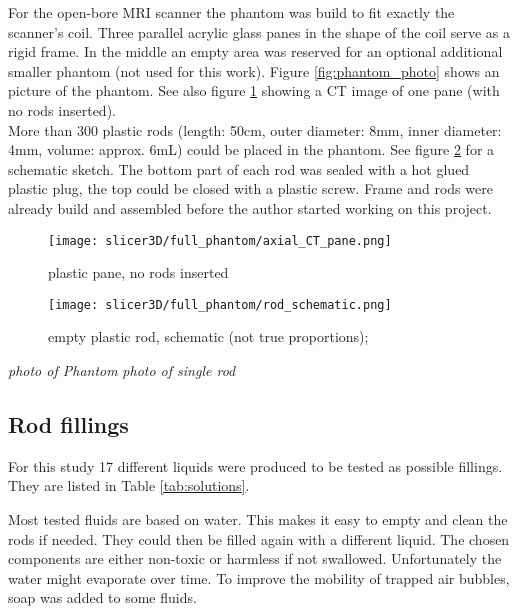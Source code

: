 For the open-bore MRI scanner the phantom was build to fit exactly the scanner's coil.
Three parallel acrylic glass panes in the shape of the coil serve as a rigid frame.
In the middle an empty area was reserved for an optional additional smaller phantom (not used for this work).
Figure \ref{fig:phantom_photo} shows an picture of the phantom. See also figure \ref{fig:axial_CT_pane} showing a CT image of one pane (with no rods inserted). \\
More than 300 plastic rods (length: 50cm, outer diameter: 8mm, inner diameter: 4mm, volume: approx. 6mL) could be placed in the phantom.
See figure \ref{fig:rod_schematic} for a schematic sketch.
The bottom part of each rod was sealed with a hot glued plastic plug, the top could be closed with a plastic screw.
Frame and rods were already build and assembled before the author started working on this project.



\begin{figure}[!tbp]
\centering
\texttt{[image: slicer3D/full\_phantom/axial\_CT\_pane.png]}
\caption{plastic pane, no rods inserted}
\label{fig:axial_CT_pane}
\end{figure}

\begin{figure}[!tbp]
\centering
\texttt{[image: slicer3D/full\_phantom/rod\_schematic.png]}
\caption{empty plastic rod, schematic (not true proportions); }
\label{fig:rod_schematic}
\end{figure}

\vspace{4cm}
\textit{photo of Phantom}
\vspace{2cm}
\vspace{4cm}
\textit{photo of single rod}
\vspace{2cm}

\subsection{Rod fillings}

For this study 17 different liquids were produced to be tested as possible fillings. They are listed in Table \ref{tab:solutions}.

Most tested fluids are based on water. This makes it easy to empty and clean the rods if needed. They could then be filled again with a different liquid.
The chosen components are either non-toxic or harmless if not swallowed.
Unfortunately the water might evaporate over time. To improve the mobility of trapped air bubbles, soap was added to some fluids.

